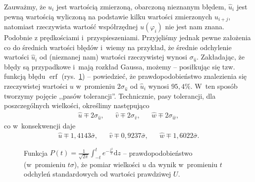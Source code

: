 \documentclass[paper=a4,DIV=12]{tmmlab}
\begin{document}
\begin{appendices}
  Zauważmy, że $u_i$ jest wartością zmierzoną, obarczoną nieznanym błędem,
  $\hat{u}_i$ jest pewną wartością wyliczoną na podstawie kilku wartości
  zmierzonych $u_{i+j}$, natomiast rzeczywista wartość współrzędnej
  $u(\varphi_i)$ nie jest nam znana. Podobnie z prędkościami
  i~przyspieszeniami. Przyjęliśmy jednak pewne założenia co do średnich
  wartości błędów i~wiemy na przykład, że średnie odchylenie wartości
  $\hat{u}_i$ od (nieznanej nam) wartości rzeczywistej wynosi
  $\sigma_{\hat{u}}$. Zakładając, że błędy są przypadkowe i~mają rozkład
  Gaussa, możemy -- posiłkując się tzw. funkcją błędu $\operatorname{erf}$
  \cite{taylor:1995:wstep} (rys.~\ref{fig:ZGRMB}) -- powiedzieć, że
  prawdopodobieństwo znalezienia się rzeczywistej wartości $u$ w~promieniu $2
  \sigma_{\hat{u}}$ od $\hat{u}_i$ wynosi $95,4\%$. W~ten sposób tworzymy
  pojęcie ,,pasów tolerancji''. Technicznie, pasy tolerancji, dla
  poszczególnych wielkości, określimy następująco
  \begin{align}
    & \hat{u} \mp 2 \sigma_{\hat{u}},&
    & \hat{v} \mp 2 \sigma_{\hat{v}},&
    & \hat{w} \mp 2 \sigma_{\hat{w}},&
    \label{eq:K8HZZ}
  \end{align}
  co w~konsekwencji daje
  \begin{align}
    & \hat{u} \mp 1,4143 \bar{\sigma},&
    & \hat{v} \mp 0,9237 \bar{\sigma},&
    & \hat{w} \mp 1,6022 \bar{\sigma}.&
    \label{eq:QP035}
  \end{align}
  \begin{figure}[htbp]
    \centering
    
    \caption{Funkcja $P(t) = \frac{1}{\sqrt{2\pi}} \int_{-t}^t
    e^{-\frac{z^2}{2}} \mathrm{d}z$ -- prawdopodobieństwo (w~promieniu
    $t\sigma$), że pomiar wielkości $u$ da wynik w~promieniu $t$ odchyleń
    standardowych od wartości prawdziwej $U$.}
    \label{fig:ZGRMB}
  \end{figure}

\end{appendices}



\end{document}

